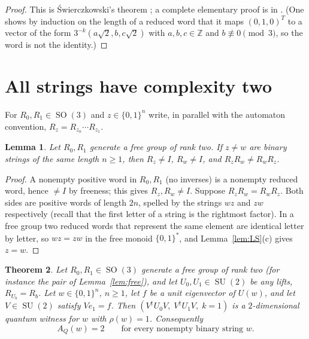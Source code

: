 \documentclass[11pt]{amsart}
\newtheorem{theorem}{Theorem}[section]
\newtheorem{lemma}[theorem]{Lemma}
\theoremstyle{definition}
\theoremstyle{remark}
\newcommand{\Z}{\mathbb{Z}}
\newcommand{\AQ}{A_Q}
\DeclareMathOperator{\SO}{SO}
\DeclareMathOperator{\SU}{SU}
\begin{document}
\begin{proof}
This is \'Swierczkowski's theorem \cite{Sw58}; a complete elementary
proof is in \cite[Theorem~2.1]{Wagon}. (One shows by induction on the
length of a reduced word that it maps $(0,1,0)^T$ to a vector of the
form $3^{-k}(a\sqrt2,b,c\sqrt2)$ with $a,b,c\in\Z$ and $b\not\equiv0
\pmod3$, so the word is not the identity.)
\end{proof}

\section{All strings have complexity two}\label{sec:all}

For $R_0,R_1\in\SO(3)$ and $z\in\{0,1\}^n$ write, in parallel with the
automaton convention, $R_z=R_{z_n}\cdots R_{z_1}$.

\begin{lemma}\label{lem:comm}
Let $R_0,R_1$ generate a free group of rank two. If $z\ne w$ are
binary strings of the same length $n\ge1$, then $R_z\ne I$, $R_w\ne
I$, and $R_zR_w\ne R_wR_z$.
\end{lemma}

\begin{proof}
A nonempty positive word in $R_0,R_1$ (no inverses) is a nonempty
reduced word, hence $\ne I$ by freeness; this gives $R_z,R_w\ne I$.
Suppose $R_zR_w=R_wR_z$. Both sides are positive words of length
$2n$, spelled by the strings $wz$ and $zw$ respectively (recall that
the first letter of a string is the rightmost factor). In a free group
two reduced words that represent the same element are identical
letter by letter, so $wz=zw$ in the free monoid $\{0,1\}^*$, and
Lemma~\ref{lem:LS}(c) gives $z=w$.
\end{proof}

\begin{theorem}\label{thm:all}
Let $R_0,R_1\in\SO(3)$ generate a free group of rank two (for
instance the pair of Lemma~\ref{lem:free}), and let $U_0,U_1\in\SU(2)$
be any lifts, $R_{U_b}=R_b$. Let $w\in\{0,1\}^n$, $n\ge1$, let $f$ be
a unit eigenvector of $U(w)$, and let $V\in\SU(2)$ satisfy
$Ve_1=f$. Then $(V^\dagger U_0V,\;V^\dagger U_1V,\;k=1)$ is a
$2$-dimensional quantum witness for $w$ with $\rho(w)=1$.
Consequently
\[
  \AQ(w)=2\qquad\text{for every nonempty binary string }w .
\]
\end{theorem}
\end{document}
